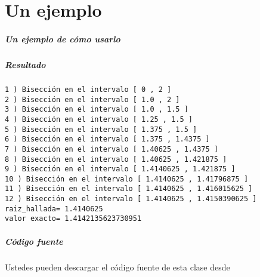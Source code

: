\documentclass[11pt]{beamer}
\def\azul{\color{blue}}
\def\rojo{\color{red}}
\begin{document}
\part{Un ejemplo}

\frame{\partpage}


\begin{frame}

\frametitle{Un ejemplo de cómo usarlo}



\end{frame}

\begin{frame}[fragile]
\frametitle{Resultado}

{\azul 
\begin{verbatim}
1 ) Bisección en el intervalo [ 0 , 2 ]
2 ) Bisección en el intervalo [ 1.0 , 2 ]
3 ) Bisección en el intervalo [ 1.0 , 1.5 ]
4 ) Bisección en el intervalo [ 1.25 , 1.5 ]
5 ) Bisección en el intervalo [ 1.375 , 1.5 ]
6 ) Bisección en el intervalo [ 1.375 , 1.4375 ]
7 ) Bisección en el intervalo [ 1.40625 , 1.4375 ]
8 ) Bisección en el intervalo [ 1.40625 , 1.421875 ]
9 ) Bisección en el intervalo [ 1.4140625 , 1.421875 ]
10 ) Bisección en el intervalo [ 1.4140625 , 1.41796875 ]
11 ) Bisección en el intervalo [ 1.4140625 , 1.416015625 ]
12 ) Bisección en el intervalo [ 1.4140625 , 1.4150390625 ]
raiz_hallada= 1.4140625
valor exacto= 1.4142135623730951

\end{verbatim}
}
\end{frame}

\begin{frame}

\frametitle{Código fuente}

{\Large

Ustedes pueden descargar el código fuente de esta clase desde

\bigskip

\rojo{
\begin{url}
https://github.com/pdenapo/metodos-numericos
\end{url}
}}

\end{frame}
\end{document}
